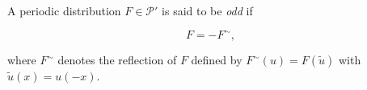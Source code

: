 A periodic distribution $F \in \mathcal{P}'$ is said to be \textit{odd} if

$$F = -F^\sim,$$

where $F^\sim$ denotes the reflection of $F$ defined by $F^\sim(u) = F(\tilde{u})$ with $\tilde{u}(x) = u(-x)$.
